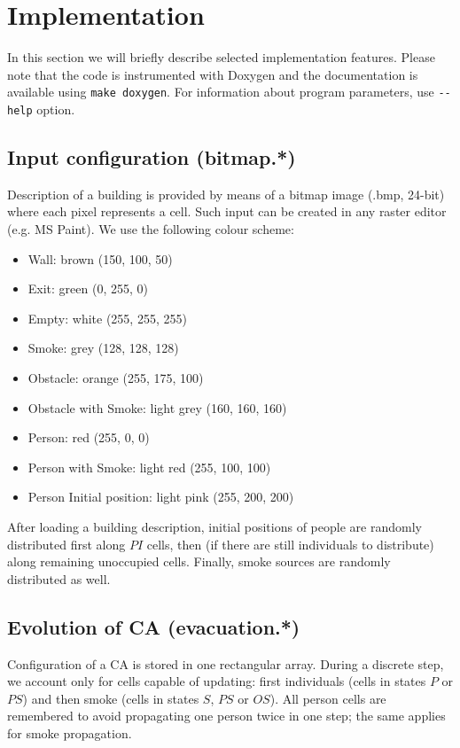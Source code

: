 \section{Implementation}
In this section we will briefly describe selected implementation features.
Please note that the code is instrumented with Doxygen and the documentation is
available using \texttt{make doxygen}.
For information about program parameters, use \texttt{-{}-help} option.

\subsection{Input configuration (bitmap.*)}
Description of a building is provided by means of a bitmap image (.bmp, 24-bit)
where each pixel represents a cell.
Such input can be created in any raster editor (e.g. MS Paint).
We use the following colour scheme:
\begin{itemize}
    \item Wall: brown (150, 100, 50)
    \item Exit: green (0, 255, 0)
    \item Empty: white (255, 255, 255)
    \item Smoke: grey (128, 128, 128)
    \item Obstacle: orange (255, 175, 100)
    \item Obstacle with Smoke: light grey (160, 160, 160)
    \item Person: red (255, 0, 0)
    \item Person with Smoke: light red (255, 100, 100)
    \item Person Initial position: light pink (255, 200, 200)
\end{itemize}

After loading a building description, initial positions of people are randomly
distributed first along $PI$ cells, then (if there are still individuals to
distribute) along remaining unoccupied cells.
Finally, smoke sources are randomly distributed as well.

\subsection{Evolution of CA (evacuation.*)}
Configuration of a CA is stored in one rectangular array.
During a discrete step, we account only for cells capable of updating: first
individuals (cells in states $P$ or $PS$) and then smoke (cells in states $S$,
$PS$ or $OS$).
All person cells are remembered to avoid propagating one person twice in one
step; the same applies for smoke propagation.

